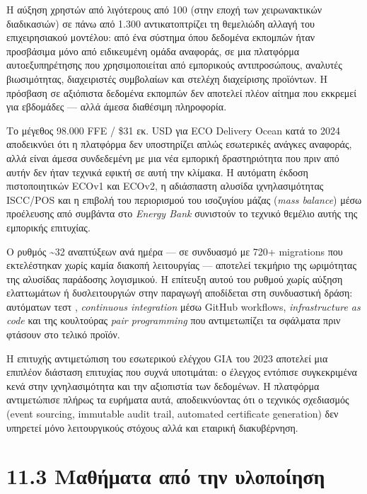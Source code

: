 \documentclass[11pt,a4paper,greek,twoside]{template-xe}
\begin{document}
Η αύξηση χρηστών από λιγότερους από 100 (στην εποχή των χειρωνακτικών
διαδικασιών) σε πάνω από 1.300 αντικατοπτρίζει τη θεμελιώδη αλλαγή του
επιχειρησιακού μοντέλου: από ένα σύστημα όπου δεδομένα εκπομπών ήταν
προσβάσιμα μόνο από ειδικευμένη ομάδα αναφοράς, σε μια πλατφόρμα
αυτοεξυπηρέτησης που χρησιμοποιείται από εμπορικούς αντιπροσώπους,
αναλυτές βιωσιμότητας, διαχειριστές συμβολαίων και στελέχη διαχείρισης
προϊόντων. Η πρόσβαση σε αξιόπιστα δεδομένα εκπομπών δεν αποτελεί πλέον
αίτημα που εκκρεμεί για εβδομάδες --- αλλά άμεσα διαθέσιμη πληροφορία.

Το μέγεθος 98.000 FFE / \$31 εκ. USD για ECO Delivery Ocean κατά το 2024
αποδεικνύει ότι η πλατφόρμα δεν υποστηρίζει απλώς εσωτερικές ανάγκες
αναφοράς, αλλά είναι άμεσα συνδεδεμένη με μια νέα εμπορική δραστηριότητα
που πριν από αυτήν δεν ήταν τεχνικά εφικτή σε αυτή την κλίμακα. Η
αυτόματη έκδοση πιστοποιητικών ECOv1 και ECOv2, η αδιάσπαστη αλυσίδα
ιχνηλασιμότητας ISCC/POS και η επιβολή του περιορισμού του ισοζυγίου
μάζας (\emph{mass balance}) μέσω προέλευσης από συμβάντα στο
\emph{Energy Bank} συνιστούν το τεχνικό θεμέλιο αυτής της εμπορικής
επιτυχίας.

Ο ρυθμός \textasciitilde32 αναπτύξεων ανά ημέρα --- σε συνδυασμό με 720+
migrations που εκτελέστηκαν χωρίς καμία διακοπή λειτουργίας --- αποτελεί
τεκμήριο της ωριμότητας της αλυσίδας παράδοσης λογισμικού. Η επίτευξη
αυτού του ρυθμού χωρίς αύξηση ελαττωμάτων ή δυσλειτουργιών στην παραγωγή
αποδίδεται στη συνδυαστική δράση: αυτόματων τεστ , \emph{continuous
integration} μέσω GitHub workflows, \emph{infrastructure as code} και
της κουλτούρας \emph{pair programming} που αντιμετωπίζει τα σφάλματα
πριν φτάσουν στο τελικό προϊόν.

Η επιτυχής αντιμετώπιση του εσωτερικού ελέγχου GIA του 2023 αποτελεί μια
επιπλέον διάσταση επιτυχίας που συχνά υποτιμάται: ο έλεγχος εντόπισε
συγκεκριμένα κενά στην ιχνηλασιμότητα και την αξιοπιστία των δεδομένων.
Η πλατφόρμα αντιμετώπισε πλήρως τα ευρήματα αυτά, αποδεικνύοντας ότι ο
τεχνικός σχεδιασμός (event sourcing, immutable audit trail, automated
certificate generation) δεν υπηρετεί μόνο λειτουργικούς στόχους αλλά και
εταιρική διακυβέρνηση.

\section{11.3 Μαθήματα από την
υλοποίηση}\label{ux3bcux3b1ux3b8ux3aeux3bcux3b1ux3c4ux3b1-ux3b1ux3c0ux3cc-ux3c4ux3b7ux3bd-ux3c5ux3bbux3bfux3c0ux3bfux3afux3b7ux3c3ux3b7}
\end{document}
